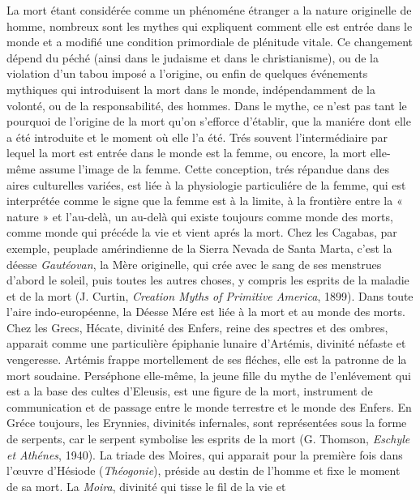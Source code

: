 La mort étant considérée comme un phénoméne étranger a la nature originelle de homme, nombreux sont les mythes
qui expliquent comment elle est entrée dans le monde et a modifié une condition primordiale de plénitude vitale. Ce changement dépend du péché (ainsi dans le judaisme et dans le christianisme), ou de la violation d'un tabou imposé a l'origine, ou enfin de quelques événements mythiques qui introduisent la mort dans le monde, indépendamment de la volonté, ou de la responsabilité, des hommes. Dans le mythe, ce n'est pas tant le pourquoi de l'origine de la mort qu'on s'efforce d'établir, que la maniére dont elle a été introduite et le moment où elle l'a été. Trés souvent l'intermédiaire par lequel la mort est entrée dans le monde est la femme, ou encore, la mort elle-même assume l'image de la femme. Cette conception, trés répandue dans des aires culturelles variées, est liée à la physiologie particuliére de la femme, qui est interprétée comme le signe que la femme est à la limite, à la frontière entre la « nature » et l'au-delà, un au-delà qui existe toujours comme monde des morts, comme monde qui précéde la vie et vient aprés la mort. Chez les Cagabas, par exemple, peuplade amérindienne de la Sierra Nevada de Santa Marta, c'est la déesse {\it Gautéovan}, la Mère originelle, qui crée avec le sang de ses menstrues d'abord le soleil, puis toutes les autres choses, y compris les esprits de la maladie et de la mort (J. Curtin, {\it Creation Myths of Primitive America}, 1899). Dans toute l'aire indo-européenne, la Déesse Mére est liée à la mort et au monde des morts. Chez les Grecs, Hécate, divinité des Enfers, reine des spectres et des ombres, apparait comme une particulière épiphanie lunaire d'Artémis, divinité néfaste et vengeresse. Artémis frappe mortellement de ses fléches, elle est la patronne de la mort soudaine. Perséphone elle-même, la jeune fille du mythe de l'enlévement qui est a la base des cultes d'Eleusis, est une figure de la mort, instrument de communication et de passage entre le monde terrestre et le monde des Enfers. En Gréce toujours, les Erynnies, divinités infernales, sont représentées sous la forme de serpents, car le serpent symbolise les esprits de la mort (G. Thomson, {\it Eschyle et Athénes}, 1940). La triade des Moires, qui apparait pour la première fois dans l'{\oe}uvre d'Hésiode ({\it Théogonie}), préside au destin de l'homme et fixe le moment de sa mort. La {\it Moira}, divinité qui tisse le fil de la vie et
